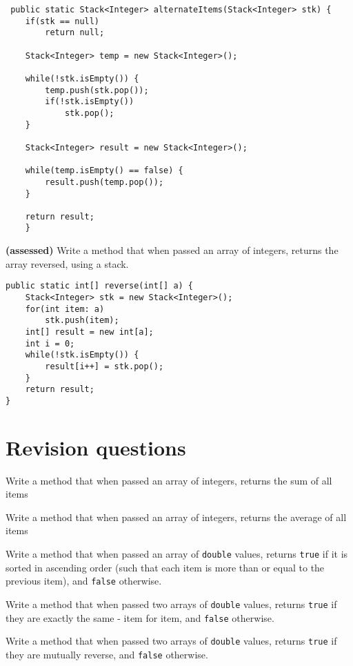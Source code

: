 \begin{questions}
\begin{solution}
 \begin{lstlisting}
 public static Stack<Integer> alternateItems(Stack<Integer> stk) {
	if(stk == null)
		return null;

	Stack<Integer> temp = new Stack<Integer>();

	while(!stk.isEmpty()) {
		temp.push(stk.pop());
		if(!stk.isEmpty())
			stk.pop();
	}

	Stack<Integer> result = new Stack<Integer>();

	while(temp.isEmpty() == false) {
		result.push(temp.pop());
	}

	return result;
	}
 \end{lstlisting}
 \end{solution}

\question \textbf{(assessed)} Write a method that when passed an array of integers, returns the array reversed, using a stack.

\begin{solution}
\begin{lstlisting}
public static int[] reverse(int[] a) {
	Stack<Integer> stk = new Stack<Integer>();
	for(int item: a)
		stk.push(item);
	int[] result = new int[a];
	int i = 0;
	while(!stk.isEmpty()) {
		result[i++] = stk.pop();
	}
	return result;
}	
\end{lstlisting}	
\end{solution}

\newpage

\section*{Revision questions}

\question Write a method that when passed an array of integers, returns the sum of all items

\question Write a method that when passed an array of integers, returns the average of all items

\question Write a method that when passed an array of \texttt{double} values, returns \texttt{true} if it is sorted in ascending order (such that each item is more than or equal to the previous item), and \texttt{false} otherwise.

\question Write a method that when passed two arrays of \texttt{double} values, returns \texttt{true} if they are exactly the same - item for item, and \texttt{false} otherwise.

\question Write a method that when passed two arrays of \texttt{double} values, returns \texttt{true} if they are mutually reverse, and \texttt{false} otherwise.


\end{questions}
